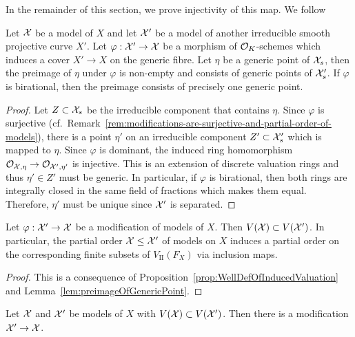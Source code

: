 In the remainder of this section, we prove injectivity of this map.
We follow \cite[Chapter 3]{Rueth}

\begin{lemma}\label{lem:preimageOfGenericPoint}
    Let $\mathcal X$ be a model of $X$ and let $\mathcal X'$ be a model of another irreducible smooth projective curve $X'$.
    Let $\varphi: \mathcal X' \to \mathcal X$ be a morphism of $\mathcal O_K $-schemes which induces a cover $X' \to X$ on the generic fibre.
    Let $\eta$ be a generic point of $\mathcal X_s$, then the preimage of $\eta$ under $\varphi$ is non-empty and consists of generic points of $\mathcal X_s'$.
    If $\varphi$ is birational, then the preimage consists of precisely one generic point.
\end{lemma}

\begin{proof}{\cite[Lemma 3.6]{Rueth}}
    Let $Z \subset \mathcal X_s$ be the irreducible component that contains $\eta$.
    Since $\varphi$ is surjective (cf.\ Remark~\ref{rem:modifications-are-surjective-and-partial-order-of-models}),
    there is a point $\eta'$ on an irreducible component $Z' \subset \mathcal X_s'$ which is mapped to $\eta$.
    Since $\varphi$ is dominant, the induced ring homomorphism $\mathcal{O}_{\mathcal X,\eta} \to \mathcal{O}_{\mathcal X',\eta'}$ is injective.
    This is an extension of discrete valuation rings and thus $\eta' \in Z'$ must be generic.
    In particular, if $\varphi$ is birational, then both rings are integrally closed in the same field of fractions which makes them equal.
    Therefore, $\eta'$ must be unique since $\mathcal X'$ is separated.
\end{proof}

\begin{lemma}\label{lemma:induced-order-on-valuations}
    Let $\varphi: \mathcal X' \to \mathcal X$ be a modification of models of $X$.
    Then $V(\mathcal X) \subset V(\mathcal X')$.
    In particular, the partial order $\mathcal X \leq \mathcal X'$ of models on $X$ induces a partial order on the corresponding finite
    subsets of $V_{\mathrm{II}}(F_X)$ via inclusion maps.
\end{lemma}

\begin{proof}
    This is a consequence of Proposition~\ref{prop:WellDefOfInducedValuation} and Lemma~\ref{lem:preimageOfGenericPoint}.
\end{proof}

\begin{proposition}
    Let $\mathcal X$ and $\mathcal X'$ be models of $X$ with $V(\mathcal X) \subset V(\mathcal X')$.
    Then there is a modification $\mathcal X' \to \mathcal X$.
\end{proposition}

